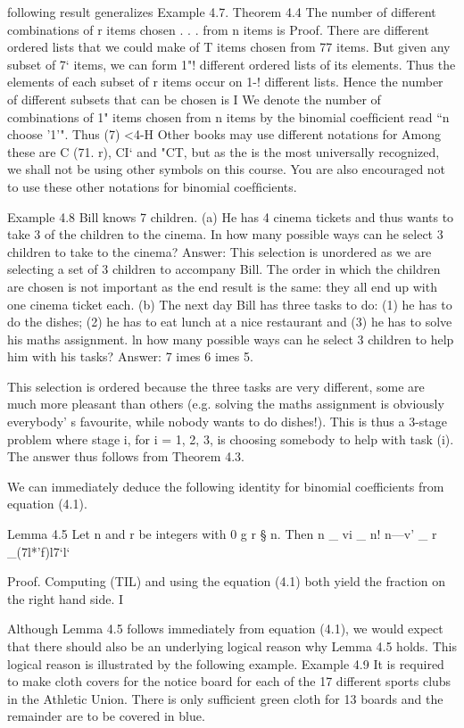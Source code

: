 \documentclass{beamer}
\begin{document}
{following result generalizes Example 4.7.
Theorem 4.4 The number of different combinations of r items chosen
. . .
from n items is 
Proof. There are  different ordered lists that we could make of
T items chosen from 77 items. But given any subset of 7‘ items, we can
form 1"! different ordered lists of its elements. Thus the elements of
each subset of r items occur on 1-! different lists. Hence the number
of different subsets that can be chosen is  I
We denote the number of combinations of 1" items chosen from n
items by the binomial coefﬁcient  read “n choose '1'". Thus
(7)  <4-H
Other books may use different notations for  Among these are
C (71. r), CI‘ and "CT, but as the  is the most universally
recognized, we shall not be using other symbols on this course. You
are also encouraged not to use these other notations for binomial
coefﬁcients.

Example 4.8 Bill knows 7 children.
(a) He has 4 cinema tickets and thus wants to take 3 of the children
to the cinema. In how many possible ways can he select 3
children to take to the cinema?
Answer: 
This selection is unordered as we are selecting a set of 3
children to accompany Bill. The order in which the children are
chosen is not important as the end result is the same: they all
end up with one cinema ticket each.
(b) The next day Bill has three tasks to do: (1) he has to do the
dishes; (2) he has to eat lunch at a nice restaurant and (3) he
has to solve his maths assignment. ln how many possible ways
can he select 3 children to help him with his tasks?
Answer: 7 	imes 6 	imes 5.

This selection is ordered because the three tasks are very
different, some are much more pleasant than others (e.g.
solving the maths assignment is obviously everybody’ s favourite,
while nobody wants to do dishes!). This is thus a 3-stage
problem where stage i, for i = 1, 2, 3, is choosing somebody to
help with task (i). The answer thus follows from Theorem 4.3.

We can immediately deduce the following identity for binomial
coefficients from equation (4.1).

Lemma 4.5 Let n and r be integers with 0 g r § n. Then
n _ vi _ n!
n—v' _ r _(7l*’f)l7‘l‘

Proof. Computing (TIL) and  using the equation (4.1) both yield
the fraction on the right hand side. I


Although Lemma 4.5 follows immediately from equation (4.1), we
would expect that there should also be an underlying logical reason
why Lemma 4.5 holds. This logical reason is illustrated by the
following example.
Example 4.9 It is required to make cloth covers for the notice board
for each of the 17 different sports clubs in the Athletic Union. There
is only sufficient green cloth for 13 boards and the remainder are to
be covered in blue.

}
\end{document}
